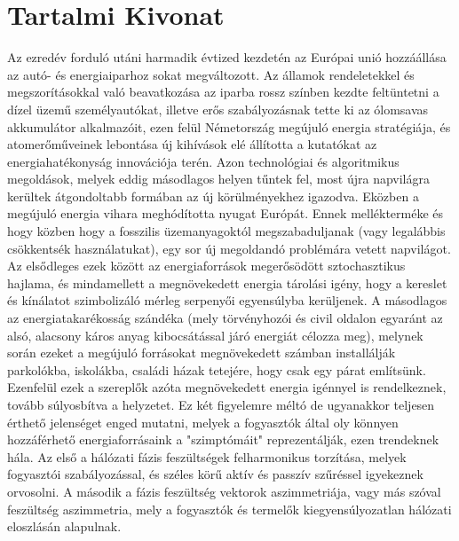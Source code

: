 %


\chapter*{Tartalmi Kivonat}
\thispagestyle{plain}
Az ezredév forduló utáni harmadik évtized kezdetén az Európai unió hozzáállása az autó- és energiaiparhoz sokat megváltozott. Az államok rendeletekkel és megszorításokkal való beavatkozása az iparba rossz színben kezdte feltüntetni a dízel üzemű személyautókat, illetve erős szabályozásnak tette ki az ólomsavas akkumulátor alkalmazóit, ezen felül Németország megújuló energia stratégiája, és atomerőműveinek lebontása új kihívások elé állította a kutatókat az energiahatékonyság innovációja terén. Azon technológiai és algoritmikus megoldások, melyek eddig másodlagos helyen tűntek fel, most újra napvilágra kerültek átgondoltabb formában az új körülményekhez igazodva. Eközben a megújuló energia vihara meghódította nyugat Európát. Ennek mellékterméke és hogy közben hogy a fosszilis üzemanyagoktól megszabaduljanak (vagy legalábbis csökkentsék használatukat), egy sor új megoldandó problémára vetett napvilágot. Az elsődleges ezek között az energiaforrások megerősödött sztochasztikus hajlama, és  mindamellett a megnövekedett energia tárolási igény, hogy a kereslet és kínálatot szimbolizáló mérleg serpenyői egyensúlyba kerüljenek. A másodlagos az energiatakarékosság szándéka (mely törvényhozói és civil oldalon egyaránt az alsó, alacsony káros anyag kibocsátással járó energiát célozza meg), melynek során ezeket a megújuló forrásokat megnövekedett számban installálják parkolókba, iskolákba, családi házak tetejére, hogy csak egy párat említsünk. Ezenfelül ezek a szereplők azóta megnövekedett energia igénnyel is rendelkeznek, tovább súlyosbítva a helyzetet. Ez két figyelemre méltó de ugyanakkor teljesen érthető jelenséget enged mutatni, melyek a fogyasztók által oly könnyen hozzáférhető energiaforrásaink a "szimptómáit" reprezentálják, ezen trendeknek hála. Az első a hálózati fázis feszültségek felharmonikus torzítása, melyek fogyasztói szabályozással, és széles körű aktív és passzív szűréssel igyekeznek orvosolni. A második a fázis feszültség vektorok aszimmetriája, vagy más szóval feszültség aszimmetria, mely a fogyasztók és termelők kiegyensúlyozatlan hálózati eloszlásán alapulnak.\\
